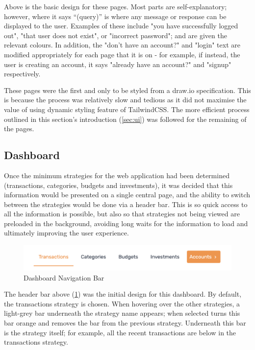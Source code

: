 Above is the basic design for these pages. Most parts are self-explanatory; however, where it says ``(query)'' is where any message or response can be displayed to the user. Examples of these include "you have successfully logged out", "that user does not exist", or "incorrect password"; and are given the relevant colours. In addition, the "don't have an account?" and "login" text are modified appropriately for each page that it is on - for example, if instead, the user is creating an account, it says "already have an account?" and "signup" respectively.

These pages were the first and only to be styled from a draw.io specification. This is because the process was relatively slow and tedious as it did not maximise the value of using dynamic styling feature of TailwindCSS. The more efficient process outlined in this section's introduction (\ref{sec:ui}) was followed for the remaining of the pages.

\subsection{Dashboard}
Once the minimum strategies for the web application had been determined (transactions, categories, budgets and investments), it was decided that this information would be presented on a single central page, and the ability to switch between the strategies would be done via a header bar. This is so quick access to all the information is possible, but also so that strategies not being viewed are preloaded in the background, avoiding long waits for the information to load and ultimately improving the user experience.

\begin{figure}[H]
	\centering
	\includegraphics[width=\textwidth]{images/header_navigation_bar.png}
	\caption{Dashboard Navigation Bar}
	\label{fig:DashboardNavigationBar}
\end{figure}

The header bar above (\ref{fig:DashboardNavigationBar}) was the initial design for this dashboard. By default, the transactions strategy is chosen. When hovering over the other strategies, a light-grey bar underneath the strategy name appears; when selected turns this bar orange and removes the bar from the previous strategy. Underneath this bar is the strategy itself; for example, all the recent transactions are below in the transactions strategy.

